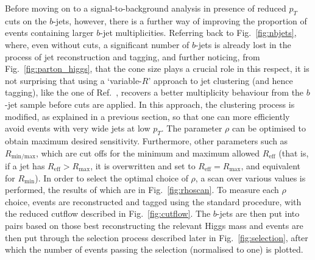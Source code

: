 \documentclass[12pt]{article}
\begin{document}
Before moving on to a signal-to-background analysis in presence of reduced $p_T$ cuts on the $b$-jets,
however, there is a further way of improving the
proportion of events containing larger $b$-jet multiplicities. Referring back to Fig.~\ref{fig:nbjets},
where, even without cuts, a significant number of $b$-jets is already lost in the process
of jet reconstruction and tagging, and further noticing, from Fig.~\ref{fig:parton_higgs}, that  the cone size plays a crucial role in this respect,
it is not surprising that  using a `{variable-$R$}' approach to jet clustering (and hence tagging), like the one of Ref.~\cite{Krohn:2009zg},
recovers a better multiplicity behaviour from
the $b$-jet sample before cuts are applied. In this approach, the clustering process is modified, as explained in a previous section, so that one
can more efficiently avoid events with very wide jets at low $p_T$. The parameter $\rho$ can be
optimised to obtain maximum desired sensitivity. Furthermore, other parameters such as $R_\text{min/max}$, which are cut offs for the minimum and maximum allowed $R_\text{eff}$ (that is, if a jet has $R_\text{eff} > R_\text{max}$, it is overwritten and set to $R_\text{eff} = R_\text{max}$, and equivalent for $R_\text{min}$). In order to select the optimal choice of $\rho$, a scan over various values is performed, the  results of which are in Fig.~\ref{fig:rhoscan}. To measure each $\rho$ choice, events are reconstructed and tagged using the standard procedure, with the reduced cutflow described in Fig.~\ref{fig:cutflow}. The $b$-jets are then put into pairs based on those best reconstructing the relevant Higgs mass and events are then put through the selection process described later in Fig.~\ref{fig:selection}, after which the number of events passing the selection (normalised to one) is plotted.
\end{document}
